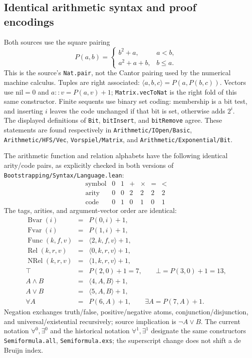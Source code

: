 \subsection{Identical arithmetic syntax and proof encodings}

Both sources use the square pairing
\[
 P(a,b)=\begin{cases}b^2+a,&a<b,\\a^2+a+b,&b\le a.\end{cases}
\]
This is the source's \texttt{Nat.pair}, not the Cantor pairing used
by the numerical machine calculus.  Tuples are right associated:
$\langle a,b,c\rangle=P(a,P(b,c))$.
Vectors use $\mathrm{nil}=0$ and $a::v=P(a,v)+1$;
\texttt{Matrix.vecToNat} is the right fold of this same constructor.
Finite sequents use binary set coding: membership is a bit test,
and inserting $i$ leaves the code unchanged if that bit is set,
otherwise adds $2^i$.  The displayed definitions of
\texttt{Bit}, \texttt{bitInsert}, and \texttt{bitRemove} agree.
These statements are found respectively in
\texttt{Arithmetic/IOpen/Basic}, \texttt{Arithmetic/HFS/Vec},
\texttt{Vorspiel/Matrix}, and \texttt{Arithmetic/Exponential/Bit}.

The arithmetic function and relation alphabets have the following
identical arity/code pairs, as explicitly checked in both versions
of \texttt{Bootstrapping/Syntax/Language.lean}:
\[
 \begin{array}{c|rrrrrr}
 \text{symbol}&0&1&+&\times&=&<\\\hline
 \text{arity}&0&0&2&2&2&2\\
 \text{code}&0&1&0&1&0&1
 \end{array}
\]
The tags, arities, and argument-vector order are identical:
\[
 \begin{array}{rcl}
 \operatorname{Bvar}(i)&=&P(0,i)+1,\\
 \operatorname{Fvar}(i)&=&P(1,i)+1,\\
 \operatorname{Func}(k,f,v)&=&\langle2,k,f,v\rangle+1,\\
 \operatorname{Rel}(k,r,v)&=&\langle0,k,r,v\rangle+1,\\
 \operatorname{NRel}(k,r,v)&=&\langle1,k,r,v\rangle+1,\\
 \top&=&P(2,0)+1=7,\qquad \bot=P(3,0)+1=13,\\
 A\land B&=&\langle4,A,B\rangle+1,\\
 A\lor B&=&\langle5,A,B\rangle+1,\\
 \forall A&=&P(6,A)+1,\qquad\exists A=P(7,A)+1.
 \end{array}
\]
Negation exchanges truth/false, positive/negative atoms,
conjunction/disjunction, and universal/existential recursively;
source implication is $\neg A\lor B$.  The current notation
$\forall^0,\exists^0$ and the historical notation
$\forall^1,\exists^1$ designate the same constructors
\texttt{Semiformula.all}, \texttt{Semiformula.exs}; the superscript
change does not shift a de Bruijn index.

